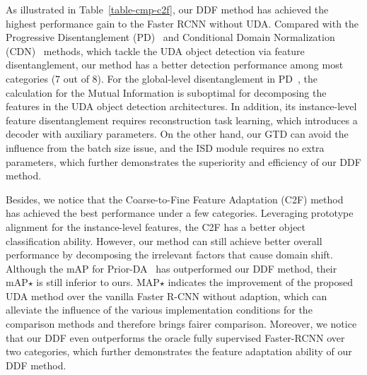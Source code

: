 \documentclass[journal]{IEEEtran}
\begin{document}
As illustrated in Table~\ref{table-cmp-c2f}, our DDF method has achieved the highest performance gain to the Faster RCNN without UDA. Compared with the Progressive Disentanglement (PD)~\cite{wu2021instance} and Conditional Domain Normalization (CDN)~\cite{su2020adapting} methods, which tackle the UDA object detection via feature disentanglement, our method has a better detection performance among most categories (7 out of 8). For the global-level disentanglement in PD~\cite{wu2021instance}, the calculation for the Mutual Information is suboptimal for decomposing the features in the UDA object detection architectures. In addition, its instance-level feature disentanglement requires reconstruction task learning, which introduces a decoder with auxiliary parameters. On the other hand, our GTD can avoid the influence from the batch size issue, and the ISD module requires no extra parameters, which further demonstrates the superiority and efficiency of our DDF method. {}

Besides, we notice that the Coarse-to-Fine Feature Adaptation (C2F) method~\cite{zheng2020cross} has achieved the best performance under a few categories. Leveraging prototype alignment for the instance-level features, the C2F has a better object classification ability. However, our method can still achieve better overall performance by decomposing the irrelevant factors that cause domain shift. Although the mAP for Prior-DA~\cite{sindagi2020prior} has outperformed our DDF method, their mAP$\star$ is still inferior to ours. MAP$\star$ indicates the improvement of the proposed UDA method over the vanilla Faster R-CNN without adaption, which can alleviate the influence of the various implementation conditions for the comparison methods and therefore brings fairer comparison. Moreover, we notice that our DDF even outperforms the oracle fully supervised Faster-RCNN over two categories, which further demonstrates the feature adaptation ability of our DDF method. 
\end{document}
